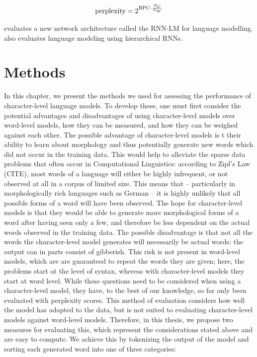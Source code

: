 \documentclass[11pt,a4paper,twoside,openright]{scrbook}
\begin{document}
\begin{equation}
\text{perplexity} = 2^{\text{BPC} \cdot {N_C \over N_W}}
\label{perplexity}
\end{equation}

\cite{mikolov} evaluates a new network architecture called the RNN-LM for language modelling. \cite{hwang} also evaluates language modeling using hierarchical RNNs.

\chapter{Methods}
\label{section:methods}
In this chapter, we present the methods we used for assessing the performance of character-level language models. To develop these, one must first consider the potential advantages and disadvantages of using character-level models over word-level models, how they can be measured, and how they can be weighed against each other.
The possible advantage of character-level models is t their ability to learn about morphology and thus potentially generate new words which did not occur in the training data. This would help to alleviate the sparse data problems that often occur in Computational Linguistics: according to Zipf’s Law (CITE), most words of a language will either be highly infrequent, or not observed at all in a corpus of limited size. This means that – particularly in morphologically rich languages such as German – it is highly unlikely that all possible forms of a word will have been observed. The hope for character-level models is that they would be able to generate more morphological forms of a word after having seen only a few, and therefore be less dependent on the actual words observed in the training data.
The possible disadvantage is that not all the words the character-level model generates will necessarily be actual words: the output can in parts consist of gibberish. This risk is not present in word-level models, which are are guaranteed to repeat the words they are given; here, the problems start at the level of syntax, whereas with character-level models they start at word level.
While these questions need to be considered when using a character-level model, they have, to the best of our knowledge, so far only been evaluated with perplexity scores. This method of evaluation considers how well the model has adapted to the data, but is not suited to evaluating character-level models against word-level models. Therefore, in this thesis, we propose two measures for evaluating this, which represent the considerations stated above and are easy to compute. 
We achieve this by tokenizing the output of the model and sorting each generated word into one of three categories:
\end{document}
